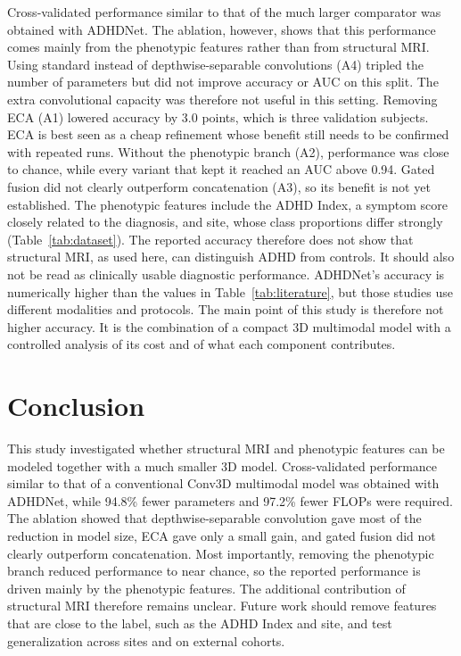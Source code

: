 \documentclass[runningheads]{llncs}
\begin{document}
Cross-validated performance similar to that of the much larger comparator was obtained with ADHDNet. The ablation, however, shows that this performance comes mainly from the phenotypic features rather than from structural MRI.
Using standard instead of depthwise-separable convolutions (A4) tripled the number of parameters but did not improve accuracy or AUC on this split. The extra convolutional capacity was therefore not useful in this setting. Removing ECA (A1) lowered accuracy by 3.0 points, which is three validation subjects. ECA is best seen as a cheap refinement whose benefit still needs to be confirmed with repeated runs. Without the phenotypic branch (A2), performance was close to chance, while every variant that kept it reached an AUC above 0.94. Gated fusion did not clearly outperform concatenation (A3), so its benefit is not yet established.
The phenotypic features include the ADHD Index, a symptom score closely related to the diagnosis, and site, whose class proportions differ strongly (Table~\ref{tab:dataset}). The reported accuracy therefore does not show that structural MRI, as used here, can distinguish ADHD from controls. It should also not be read as clinically usable diagnostic performance. ADHDNet's accuracy is numerically higher than the values in Table~\ref{tab:literature}, but those studies use different modalities and protocols. The main point of this study is therefore not higher accuracy. It is the combination of a compact 3D multimodal model with a controlled analysis of its cost and of what each component contributes.

\section{Conclusion}

This study investigated whether structural MRI and phenotypic features can be modeled together with a much smaller 3D model. Cross-validated performance similar to that of a conventional Conv3D multimodal model was obtained with ADHDNet, while 94.8\% fewer parameters and 97.2\% fewer FLOPs were required. The ablation showed that depthwise-separable convolution gave most of the reduction in model size, ECA gave only a small gain, and gated fusion did not clearly outperform concatenation. Most importantly, removing the phenotypic branch reduced performance to near chance, so the reported performance is driven mainly by the phenotypic features. The additional contribution of structural MRI therefore remains unclear. Future work should remove features that are close to the label, such as the ADHD Index and site, and test generalization across sites and on external cohorts.





\end{document}
